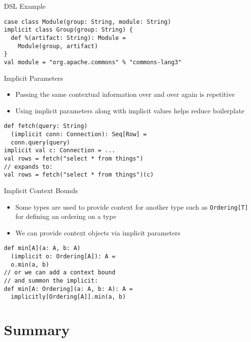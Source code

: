\documentclass{beamer}
\begin{document}
\begin{frame}[fragile]{DSL Example}
\begin{lstlisting}
case class Module(group: String, module: String)
implicit class Group(group: String) {
  def %(artifact: String): Module =
    Module(group, artifact)
}
val module = "org.apache.commons" % "commons-lang3"
\end{lstlisting}
\end{frame}

\begin{frame}[fragile]{Implicit Parameters}
\begin{itemize}
\item Passing the same contextual information over and over again is repetitive
\item Using implicit parameters along with implicit values helps reduce boilerplate
\end{itemize}
\begin{lstlisting}
def fetch(query: String)
  (implicit conn: Connection): Seq[Row] =
  conn.query(query)
implicit val c: Connection = ...
val rows = fetch("select * from things")
// expands to:
val rows = fetch("select * from things")(c)
\end{lstlisting}
\end{frame}

\begin{frame}[fragile]{Implicit Context Bounds}
\begin{itemize}
\item Some types are used to provide context for another type such as
\lstinline{Ordering[T]} for defining an ordering on a type
\item We can provide context objects via implicit parameters
\end{itemize}
\begin{lstlisting}
def min[A](a: A, b: A)
  (implicit o: Ordering[A]): A =
  o.min(a, b)
// or we can add a context bound
// and summon the implicit:
def min[A: Ordering](a: A, b: A): A =
  implicitly[Ordering[A]].min(a, b)
\end{lstlisting}
\end{frame}

\section*{Summary}
\end{document}
